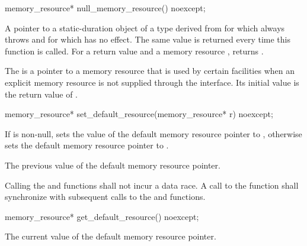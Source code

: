 %
\begin{itemdecl}
memory_resource* null_memory_resource() noexcept;
\end{itemdecl}

\begin{itemdescr}
\pnum
\returns
A pointer to a static-duration object of a type derived from 
for which  always throws  and
for which  has no effect.
The same value is returned every time this function is called.
For a return value  and a memory resource ,
 returns .
\end{itemdescr}

\pnum
The  is a pointer to a memory resource
that is used by certain facilities when an explicit memory resource
is not supplied through the interface.
Its initial value is the return value of .

%
\begin{itemdecl}
memory_resource* set_default_resource(memory_resource* r) noexcept;
\end{itemdecl}

\begin{itemdescr}
\pnum
\effects
If  is non-null,
sets the value of the default memory resource pointer to ,
otherwise sets the default memory resource pointer to .

\pnum
\returns
The previous value of the default memory resource pointer.

\pnum
\remarks
Calling the  and
 functions shall not incur a data race.
A call to the  function
shall synchronize with subsequent calls to
the  and  functions.
\end{itemdescr}

%
\begin{itemdecl}
memory_resource* get_default_resource() noexcept;
\end{itemdecl}

\begin{itemdescr}
\pnum
\returns
The current value of the default memory resource pointer.
\end{itemdescr}

